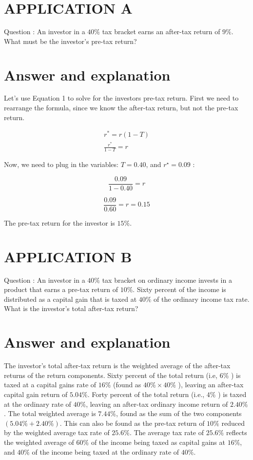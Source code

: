 \documentclass[11pt]{article}
\begin{document}
\section*{APPLICATION A}
Question : An investor in a $40 \%$ tax bracket earns an after-tax return of $9 \%$. What must be the investor's pre-tax return?

\section*{Answer and explanation}
Let's use Equation 1 to solve for the investors pre-tax return. First we need to rearrange the formula, since we know the after-tax return, but not the pre-tax return.

$$
\begin{gathered}
r^{*}=r(1-T) \\
\frac{r^{*}}{1-T}=r
\end{gathered}
$$

Now, we need to plug in the variables: $T=0.40$, and $r^{\star}=0.09$ :

$$
\frac{0.09}{1-0.40}=r
$$

$$
\frac{0.09}{0.60}=r=0.15
$$

The pre-tax return for the investor is $15 \%$.

\section*{APPLICATION B}
Question : An investor in a $40 \%$ tax bracket on ordinary income invests in a product that earns a pre-tax return of $10 \%$. Sixty percent of the income is distributed as a capital gain that is taxed at $40 \%$ of the ordinary income tax rate. What is the investor's total after-tax return?

\section*{Answer and explanation}
The investor's total after-tax return is the weighted average of the after-tax returns of the return components. Sixty percent of the total return (i.e, $6 \%$ ) is taxed at a capital gains rate of $16 \%$ (found as $40 \% \times 40 \%$ ), leaving an after-tax capital gain return of $5.04 \%$. Forty percent of the total return (i.e., $4 \%$ ) is taxed at the ordinary rate of $40 \%$, leaving an after-tax ordinary income return of $2.40 \%$. The total weighted average is $7.44 \%$, found as the sum of the two components $(5.04 \%+2.40 \%)$. This can also be found as the pre-tax return of $10 \%$ reduced by the weighted average tax rate of $25.6 \%$. The average tax rate of $25.6 \%$ reflects the weighted average of $60 \%$ of the income being taxed as capital gains at $16 \%$, and $40 \%$ of the income being taxed at the ordinary rate of $40 \%$.
\end{document}
